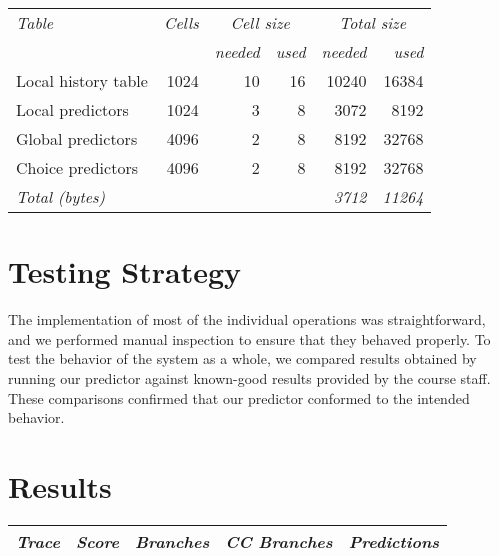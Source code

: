 \documentclass[11pt]{article}
\begin{document}
\begin{tabular}{|l|r|rr|rr|}
\hline
\it Table & \it Cells & \multicolumn{2}{|c|}{\it Cell size} & \multicolumn{2}{|c|}{\it Total size} \\
 & & \it needed & \it used & \it needed & \it used \\
\hline
Local history table & 1024 & 10 & 16 & 10240 & 16384 \\
Local predictors & 1024 & 3 & 8 & 3072 & 8192 \\
Global predictors & 4096 & 2 & 8 & 8192 & 32768 \\
Choice predictors & 4096 & 2 & 8 & 8192 & 32768 \\
\hline
\multicolumn{4}{|l|}{\it Total (bytes)} & \it 3712 & \it 11264 \\
\hline
\end{tabular}

\section{Testing Strategy}

The implementation of most of the individual operations was straightforward, and we performed manual
inspection to ensure that they behaved properly.  To test the behavior of the system as a whole, we
compared results obtained by running our predictor against known-good results provided by the course
staff.  These comparisons confirmed that our predictor conformed to the intended behavior.

\section{Results}

\begin{tabular}{|l|rrrr|}
\hline
\it Trace & \it Score & \it Branches & \it CC Branches & \it Predictions \\
\hline

\hline
\end{tabular}
\end{document}
